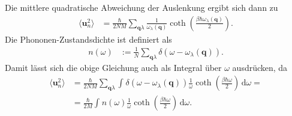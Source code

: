 \documentclass[english, parskip=full]{scrartcl}
\renewcommand{\bra}{}
\newcommand{\intx}{}
\newcommand{\kla}{}
\begin{document}
Die mittlere quadratische Abweichung der Auslenkung ergibt sich dann zu
\begin{align}
\bra\langle \textbf{u}_n^2 \rangle &= \frac{\hbar}{2NM} \sum_{\textbf{q} \lambda} \frac{1}{\omega_\lambda( \textbf{q}) } \coth\kla\left( \frac{\beta\hbar\omega_\lambda (\textbf{q})}{2} \right).
\end{align}
Die Phononen-Zustandsdichte ist definiert als
\begin{align}
n(\omega) &:= \frac{1}{N} \sum_{\textbf{q} \lambda} \delta\kla\left( \omega - \omega_\lambda ( \textbf{q}) \right).
\end{align}
Damit lässt sich die obige Gleichung auch als Integral über $\omega$ ausdrücken, da
\begin{align}
\bra\langle \textbf{u}_n^2 \rangle &= \frac{\hbar}{2NM} \sum_{\textbf{q} \lambda} \intx\int_{ }^{ } \delta \kla\left( \omega - \omega_\lambda (\textbf{q}) \right) \frac{1}{\omega} \coth\kla\left( \frac{\beta\hbar\omega}{2} \right) \, \mathrm{d}\omega = \\
&= \frac{\hbar}{2M} \intx\int_{ }^{ }n(\omega) \frac{1}{\omega} \coth\kla\left( \frac{\beta\hbar\omega}{2} \right) \, \mathrm{d}\omega.
\end{align}
\end{document}
